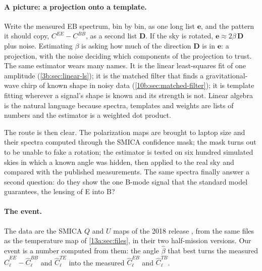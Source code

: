 \paragraph{A picture: a projection onto a template.} Write the measured EB spectrum, bin by bin, as one
long list $\bm e$, and the pattern it should copy, $C^{EE}-C^{BB}$, as a second list $\bm D$. If the sky is
rotated, $\bm e\approx2\beta\,\bm D$ plus noise. Estimating $\beta$ is asking how much of the direction
$\bm D$ is in $\bm e$: a projection, with the noise deciding which components of the projection to
trust. The same estimator wears many names. It is the linear least-squares fit of one amplitude
(\cref{3b:sec:linear-ls}); it is the matched filter that finds a gravitational-wave chirp of known shape
in noisy data (\cref{10b:sec:matched-filter}); it is template fitting wherever a signal's shape is
known and its strength is not. Linear algebra is the natural language because spectra, templates and
weights are lists of numbers and the estimator is a weighted dot product.

The route is then clear. The polarization maps are brought to laptop size and their spectra computed
through the SMICA confidence mask; the mask turns out to be unable to fake a rotation; the estimator is
tested on six hundred simulated skies in which a known angle was hidden, then applied to the real sky and
compared with the published measurements. The same spectra finally answer a second question: do they
show the one B-mode signal that the standard model guarantees, the lensing of E into B?

\paragraph{The event.} The data are the SMICA $Q$ and $U$ maps of the 2018 release
\cite{Planck2018I,Planck2018IV}, from the same files as the temperature map of \cref{13a:sec:files}, in
their two half-mission versions. Our event is a number computed from them: the angle $\hat\beta$ that best
turns the measured $\widehat C^{EE}_\ell-\widehat C^{BB}_\ell$ and $\widehat C^{TE}_\ell$ into the measured
$\widehat C^{EB}_\ell$ and $\widehat C^{TB}_\ell$.

